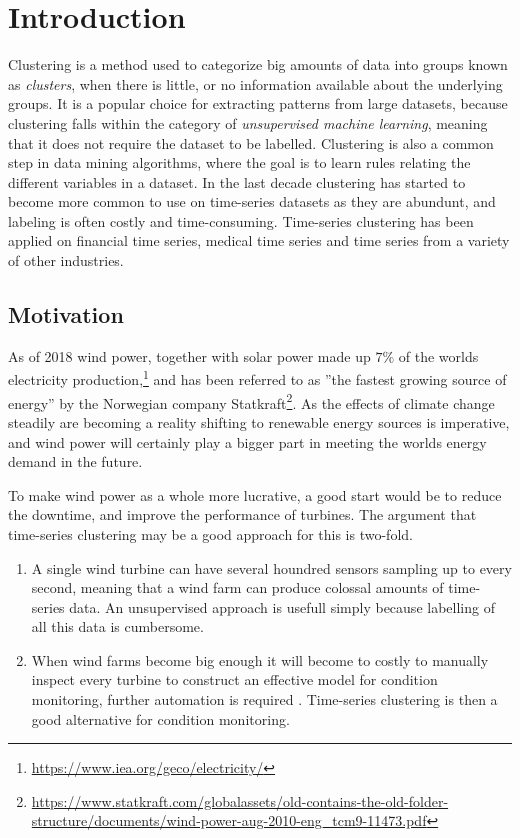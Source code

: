 \chapter{Introduction}

Clustering is a method used to categorize big amounts of data into groups known as \textit{clusters}, when there is little, or no information available about the underlying groups. It is a popular choice for extracting patterns from large datasets, because clustering falls within the category of \textit{unsupervised machine learning}, meaning that it does not require the dataset to be labelled. Clustering is also a common step in data mining algorithms, where the goal is to learn rules relating the different variables in a dataset. In the last decade clustering has started to become more common to use on time-series datasets as they are abundunt, and labeling is often costly and time-consuming. Time-series clustering has been applied on financial time series, medical time series and time series from a variety of other industries. \bigskip

\section{Motivation}

As of 2018 wind power, together with solar power made up $7\%$ of the worlds electricity production,\footnote{\url{https://www.iea.org/geco/electricity/}} and has been referred to as ''the fastest growing source of energy'' by the Norwegian company Statkraft\footnote{\url{https://www.statkraft.com/globalassets/old-contains-the-old-folder-structure/documents/wind-power-aug-2010-eng_tcm9-11473.pdf}}. As the effects of climate change steadily are becoming a reality shifting to renewable energy sources is imperative, and wind power will certainly play a bigger part in meeting the worlds energy demand in the future. \bigskip

To make wind power as a whole more lucrative, a good start would be to reduce the downtime, and improve the performance of turbines. The argument that time-series clustering may be a good approach for this is two-fold. 

\begin{enumerate}
    \item A single wind turbine can have several houndred sensors sampling up to every second, meaning that a wind farm can produce colossal amounts of time-series data. An unsupervised approach is usefull simply because labelling of all this data is cumbersome.
    \item When wind farms become big enough it will become to costly to manually inspect every turbine to construct an effective model for condition monitoring, further automation is required \cite{espen}. Time-series clustering is then a good alternative for condition monitoring.
\end{enumerate}

